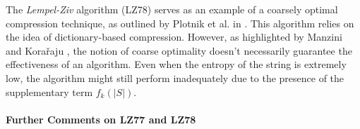 \noindent The \emph{Lempel-Ziv} algorithm (LZ78) serves as an example of a coarsely optimal compression technique, as outlined by Plotnik et al. in \cite{plotnik1992upper}. This algorithm relies on the idea of dictionary-based compression. However, as highlighted by Manzini and Kora\v{r}aju \cite{kosaraju2000compression}, the notion of coarse optimality doesn't necessarily guarantee the effectiveness of an algorithm. Even when the entropy of the string is extremely low, the algorithm might still perform inadequately due to the presence of the supplementary term $f_k(|S|)$.

\newpage
\paragraph{Further Comments on LZ77 and LZ78} 
